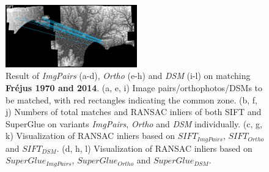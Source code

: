 \begin{figure}[htbp]
\begin{center}
{\begin{minipage}[t]{0.48\linewidth}
				\centering
				\includegraphics[width=5.7cm]{images/Chapitre3/Homol-SIFT2Step-Rough-2DRANSAC_MEC-Malt_Tapas_1970_MEC-Malt_2014.png}
			\end{minipage}%
		}
		\caption{{\scriptsize Result of \textit{ImgPairs} (a-d), \textit{Ortho} (e-h) and \textit{DSM} (i-l) on matching \textbf{Fr{\'e}jus 1970 and 2014}. (a, e, i) Image pairs/orthophotos/DSMs to be matched, with red rectangles indicating the common zone. (b, f, j) Numbers of total matches and RANSAC inliers of both SIFT and SuperGlue on variants \textit{ImgPairs}, \textit{Ortho} and \textit{DSM} individually. (c, g, k) Visualization of RANSAC inliers based on $SIFT_{ImgPairs}$, $SIFT_{Ortho}$ and $SIFT_{DSM}$. (d, h, l) Visualization of RANSAC inliers based on $SuperGlue_{ImgPairs}$, $SuperGlue_{Ortho}$ and $SuperGlue_{DSM}$.}}
		\label{MatchVizFrejus1970DSM}
	\end{center}
\end{figure} 


